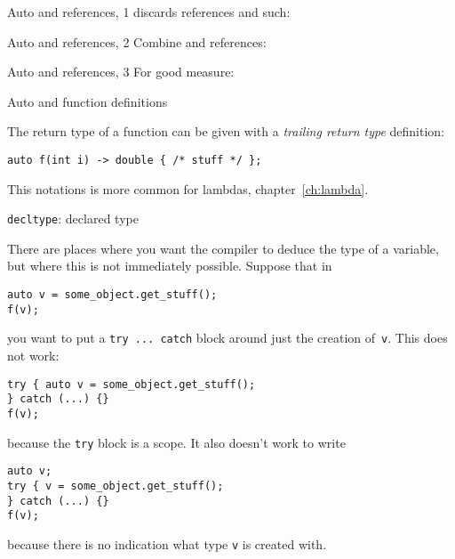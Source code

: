 \begin{block}{Auto and references, 1}
  \label{sl:auto-ref1}
   discards references and such:
\end{block}

\begin{block}{Auto and references, 2}
  \label{sl:auto-ref2}
  Combine  and references:
\end{block}

\begin{block}{Auto and references, 3}
  \label{sl:auto-ref3}
  For good measure:
  \lstset{numbers=left,numberstyle=\tiny}
\end{block}

\begin{comment}
  \begin{block}{Auto plus}
    \label{sl:auto-plus-const}
    Keywords like \n{const} and the reference character~\n{\&} can be
    added:
\begin{lstlisting}
// class member
  some_object my_object;
// class method:
  some_object &get_some_object() { return my_object; };
// main program:
auto object_copy  = thing.get_some_object();
auto &object_mutable  = thing.get_some_object();
const auto &object_immutable  = thing.get_some_object();
\end{lstlisting}
  \end{block}
\end{comment}

 {Auto and function definitions}

The return type of a function can be given with a
\emph{trailing return type}
definition:
\begin{lstlisting}
auto f(int i) -> double { /* stuff */ };
\end{lstlisting}
This notations is more common for lambdas, chapter~\ref{ch:lambda}.

 {\texttt{decltype}: declared type}

There are places where you want the compiler to deduce the type of a
variable, but where this is not immediately possible. Suppose that in
\begin{lstlisting}
auto v = some_object.get_stuff();
f(v);
\end{lstlisting}
you want to put a \lstinline{try ... catch} block around just the
creation of~\lstinline{v}. This does not work:
\begin{lstlisting}
try { auto v = some_object.get_stuff(); 
} catch (...) {}
f(v);
\end{lstlisting}
because the \lstinline{try} block is a scope. It also doesn't work to write
\begin{lstlisting}
auto v;
try { v = some_object.get_stuff(); 
} catch (...) {}
f(v);
\end{lstlisting}
because there is no indication what type \lstinline{v} is created
with.

